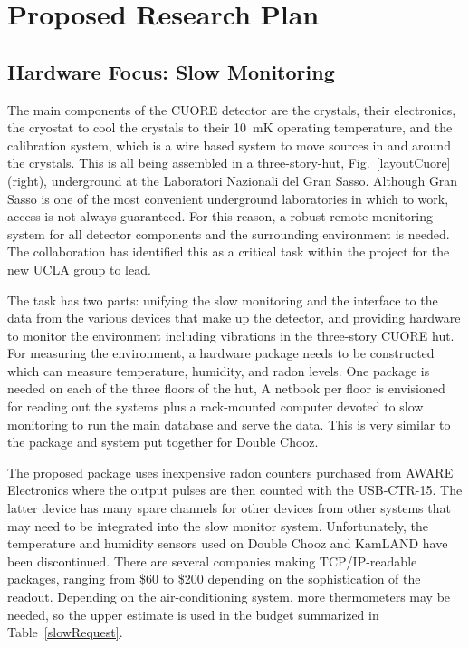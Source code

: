 \section{Proposed Research Plan}

\subsection{Hardware Focus: Slow Monitoring}
The main components of the CUORE detector are the crystals, their electronics, the cryostat to cool the crystals to their 10~mK operating temperature, and the calibration system, which is a wire based system to move sources in and around the crystals. This is all being assembled in a three-story-hut,  Fig.~\ref{layoutCuore} (right), underground at the Laboratori Nazionali del Gran Sasso. Although Gran Sasso is one of the most convenient underground laboratories in which to work, access is not always guaranteed. For this reason, a robust remote monitoring system for all detector components and the surrounding environment is needed. The collaboration has identified this as a critical task within the project for the new UCLA group to lead.

The task has two parts: unifying the slow monitoring and the interface to the data from the various devices that make up the detector, and providing hardware to monitor the environment including vibrations in the three-story CUORE hut. For measuring the environment, a hardware package needs to be constructed which can measure temperature, humidity, and radon levels.  One package is needed on each of the three floors of the hut, A netbook per floor is envisioned for reading out the systems plus a rack-mounted computer devoted to slow monitoring to run the main database and serve the data. This is very similar to the package and system put together for Double Chooz. 

The proposed package uses inexpensive radon counters purchased from AWARE Electronics\cite{aware} where the output pulses are then counted with the USB-CTR-15\cite{usbctr}.  The latter device has many spare channels for other devices from other systems that may need to be integrated into the slow monitor system. Unfortunately, the temperature and humidity sensors used on Double Chooz and KamLAND have been discontinued. There are several companies making TCP/IP-readable packages, ranging from \$60 to \$200 depending on the sophistication of the readout. Depending on the air-conditioning system, more thermometers may be needed, so the upper estimate is used in the budget summarized in Table~\ref{slowRequest}. 

